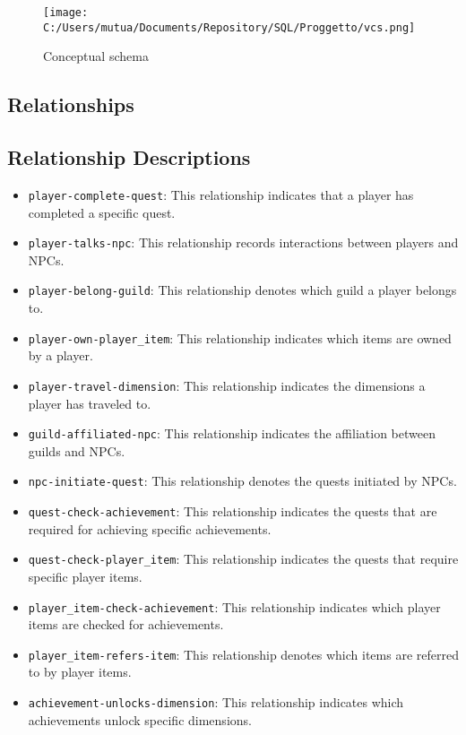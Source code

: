 \documentclass{article}
\begin{document}
\begin{figure}[ht]
    \centering
    \texttt{[image: C:/Users/mutua/Documents/Repository/SQL/Proggetto/vcs.png]}
    \caption{Conceptual schema}
    \label{fig:conceptual_schema}
\end{figure}

\subsection{Relationships}

\subsection{Relationship Descriptions}

\begin{itemize}
    \item \lstinline|player-complete-quest|: This relationship indicates that a player has completed a specific quest.
    \item \lstinline|player-talks-npc|: This relationship records interactions between players and NPCs.
    \item \lstinline|player-belong-guild|: This relationship denotes which guild a player belongs to.
    \item \lstinline|player-own-player_item|: This relationship indicates which items are owned by a player.
    \item \lstinline|player-travel-dimension|: This relationship indicates the dimensions a player has traveled to.
    \item \lstinline|guild-affiliated-npc|: This relationship indicates the affiliation between guilds and NPCs.
    \item \lstinline|npc-initiate-quest|: This relationship denotes the quests initiated by NPCs.
    \item \lstinline|quest-check-achievement|: This relationship indicates the quests that are required for achieving specific achievements.
    \item \lstinline|quest-check-player_item|: This relationship indicates the quests that require specific player items.
    \item \lstinline|player_item-check-achievement|: This relationship indicates which player items are checked for achievements.
    \item \lstinline|player_item-refers-item|: This relationship denotes which items are referred to by player items.
    \item \lstinline|achievement-unlocks-dimension|: This relationship indicates which achievements unlock specific dimensions.
\end{itemize}
\end{document}
